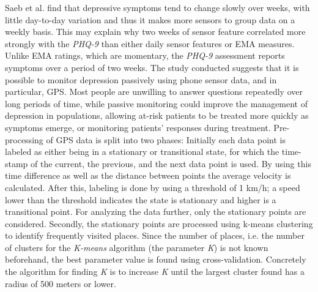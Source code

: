 Saeb et al. find that depressive symptoms tend to change slowly over weeks, with little day-to-day variation and thus it makes more sensors to group data on a weekly basis. This may explain why two weeks of sensor feature correlated more strongly with the \textit{PHQ-9} than either daily sensor features or EMA measures. Unlike EMA ratings, which are momentary, the \textit{PHQ-9} assessment reports symptoms over a period of two weeks. The study conducted suggests that it is possible to monitor depression passively using phone sensor data, and in particular, GPS. Most people are unwilling to answer questions repeatedly over long periods of time, while passive monitoring could improve the management of depression in populations, allowing at-risk patients to be treated more quickly as symptoms emerge, or monitoring patients’ responses during treatment. Pre-processing of GPS data is split into two phases: Initially each data point is labeled as either being in a stationary or transitional state, for which the time-stamp of the current, the previous, and the next data point is used. By using this time difference as well as the distance between points the average velocity is calculated. After this, labeling is done by using a threshold of 1 km/h; a speed lower than the threshold indicates the state is stationary and higher is a transitional point. For analyzing the data further, only the stationary points are considered. Secondly, the stationary points are processed using k-means clustering to identify frequently visited places. Since the number of places, i.e. the number of clusters for the \textit{K-means} algorithm (the parameter \textit{K}) is not known beforehand, the best parameter value is found using cross-validation. Concretely the algorithm for finding \textit{K} is to increase \textit{K} until the largest cluster found has a radius of 500 meters or lower.


